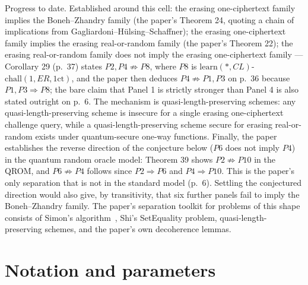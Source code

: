 \documentclass{aicr-conjecture}
\newcommand{\onect}{1\mathrm{ct}}
\newcommand{\learn}{\mathrm{learn}}
\newcommand{\chall}{\mathrm{chall}}
\begin{document}
Progress to date. Established around this cell: the erasing
one-ciphertext family implies the Boneh--Zhandry family (the paper's
Theorem 24, quoting a chain of implications from
Gagliardoni--H\"ulsing--Schaffner); the erasing one-ciphertext family
implies the erasing real-or-random family (the paper's Theorem 22); the
erasing real-or-random family does not imply the erasing one-ciphertext
family --- Corollary 29 (p.~37) states $P2, P4\not\Rightarrow P8$, where
$P8$ is $\learn(*,CL)$-$\chall(1,ER,\onect)$, and the paper then deduces
$P4\not\Rightarrow P1, P3$ on p.~36 because $P1, P3\Rightarrow P8$; the
bare claim that Panel 1 is strictly stronger than Panel 4 is also stated
outright on p.~6. The mechanism is quasi-length-preserving schemes: any
quasi-length-preserving scheme is insecure for a single erasing
one-ciphertext challenge query, while a quasi-length-preserving scheme
secure for erasing real-or-random exists under quantum-secure one-way
functions. Finally, the paper establishes the reverse direction of the
conjecture below ($P6$ does not imply $P4$) in the quantum random oracle
model: Theorem 39 shows $P2\not\Rightarrow P10$ in the QROM, and
$P6\not\Rightarrow P4$ follows since $P2\Rightarrow P6$ and
$P4\Rightarrow P10$. This is the paper's only separation that is not in
the standard model (p.~6). Settling the conjectured direction would
also give, by transitivity, that six further panels fail to imply the
Boneh--Zhandry family. The paper's separation toolkit for problems of
this shape consists of Simon's algorithm~\cite{Sim97}, Shi's
SetEquality problem, quasi-length-preserving schemes, and the paper's
own decoherence lemmas.

\section{Notation and parameters}\label{sec:notation}
\end{document}
